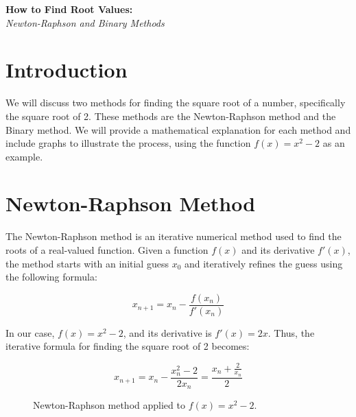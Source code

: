 \documentclass{article}
\theoremstyle{definition}
\begin{document}
\begin{center}
	\huge\textbf{How to Find Root Values:}\\
	\Large\textit{Newton-Raphson and Binary Methods}\\
	\vspace{0.5em}
\end{center}

\section{Introduction}

We will discuss two methods for finding the square root of a number, specifically the square root of 2. These methods are the Newton-Raphson method and the Binary method. We will provide a mathematical explanation for each method and include graphs to illustrate the process, using the function $f(x) = x^2 - 2$ as an example.

\section{Newton-Raphson Method}

The Newton-Raphson method is an iterative numerical method used to find the roots of a real-valued function. Given a function $f(x)$ and its derivative $f'(x)$, the method starts with an initial guess $x_0$ and iteratively refines the guess using the following formula:

\[
x_{n+1} = x_n - \frac{f(x_n)}{f'(x_n)}
\]

In our case, $f(x) = x^2 - 2$, and its derivative is $f'(x) = 2x$. Thus, the iterative formula for finding the square root of 2 becomes:

\[
x_{n+1} = x_n - \frac{x_n^2 - 2}{2x_n} = \frac{x_n + \frac{2}{x_n}}{2}
\]

\begin{figure}[ht]
	\centering
	\caption{Newton-Raphson method applied to $f(x) = x^2 - 2$.}
\end{figure}
\end{document}
